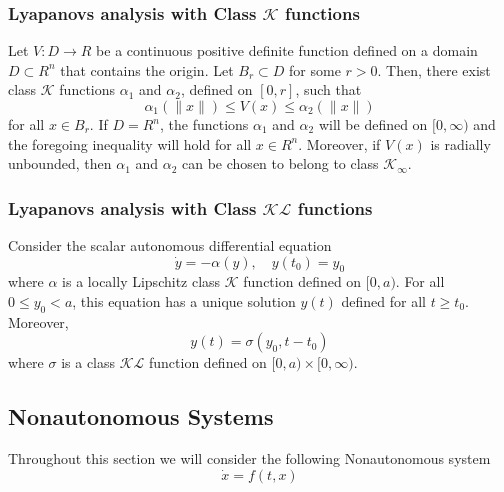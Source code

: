 \documentclass{article}
\begin{document}
\subsubsection{Lyapanovs analysis with Class $\mathcal{K}$ functions}
Let $V: D \rightarrow R$ be a continuous positive definite function defined on a domain $D \subset R^n$ that contains the origin. Let $B_r \subset D$ for some $r>0$. Then, there exist class $\mathcal{K}$ functions $\alpha_1$ and $\alpha_2$, defined on $[0, r]$, such that
\[
	\alpha_1(\|x\|) \leq V(x) \leq \alpha_2(\|x\|)
\]
for all $x \in B_r$. If $D=R^n$, the functions $\alpha_1$ and $\alpha_2$ will
be defined on $[0, \infty)$ and the foregoing inequality will hold for all $x
	\in R^n$. Moreover, if $V(x)$ is radially unbounded, then $\alpha_1$ and
$\alpha_2$ can be chosen to belong to class $\mathcal{K}_{\infty}$.
\subsubsection{Lyapanovs analysis with Class $\mathcal{K} \mathcal{L}$ functions}
Consider the scalar autonomous differential equation
$$
	\dot{y}=-\alpha(y), \quad y\left(t_0\right)=y_0
$$
where $\alpha$ is a locally Lipschitz class $\mathcal{K}$ function defined on $[0, a)$. For all $0 \leq y_0<a$, this equation has a unique solution $y(t)$ defined for all $t \geq t_0$. Moreover,
$$
	y(t)=\sigma\left(y_0, t-t_0\right)
$$
where $\sigma$ is a class $\mathcal{K} \mathcal{L}$ function defined on $[0, a) \times[0, \infty)$.
\subsection{Nonautonomous Systems}
Throughout this section we will consider the following Nonautonomous system
\begin{equation*}
	\dot x = f(t,x)
	\label{Nonautonomous system}
\end{equation*}
\end{document}
